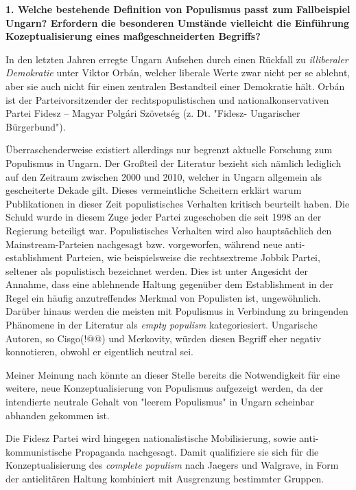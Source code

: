 \documentclass[11pt]{report}
\date{\today}
\title{}
\begin{document}
\tableofcontents

\textbf{1. Welche bestehende Definition von Populismus passt zum Fallbeispiel Ungarn? Erfordern die besonderen Umstände vielleicht die Einführung Kozeptualisierung eines maßgeschneiderten Begriffs?}

In den letzten Jahren erregte Ungarn Aufsehen durch einen Rückfall zu \emph{illiberaler Demokratie} unter Viktor Orbán, welcher liberale Werte zwar nicht per se ablehnt, aber sie auch nicht für einen zentralen Bestandteil einer Demokratie hält. Orbán ist der Parteivorsitzender der rechtspopulistischen und nationalkonservativen Partei Fidesz – Magyar Polgári Szövetség (z. Dt. "Fidesz- Ungarischer Bürgerbund").

Überraschenderweise existiert allerdings nur begrenzt aktuelle Forschung zum Populismus in Ungarn. Der Großteil der Literatur bezieht sich nämlich lediglich auf den Zeitraum zwischen 2000 und 2010, welcher in Ungarn allgemein als gescheiterte Dekade gilt. Dieses vermeintliche Scheitern erklärt warum Publikationen in dieser Zeit populistisches Verhalten kritisch beurteilt haben. Die Schuld wurde in diesem Zuge jeder Partei zugeschoben die seit 1998 an der Regierung beteiligt war. Populistisches Verhalten wird also hauptsächlich den Mainstream-Parteien nachgesagt bzw. vorgeworfen, während neue anti-establishment Parteien, wie beispielsweise die rechtsextreme Jobbik Partei, seltener als populistisch bezeichnet werden. Dies ist unter Angesicht der Annahme, dass eine ablehnende Haltung gegenüber dem Establishment in der Regel ein häufig anzutreffendes Merkmal von Populisten ist, ungewöhnlich. Darüber hinaus werden die meisten mit Populismus in Verbindung zu bringenden Phänomene in der Literatur als \emph{empty populism} kategoriesiert. Ungarische Autoren, so Cisgo(!@@) und Merkovity, würden diesen Begriff eher negativ konnotieren, obwohl er eigentlich neutral sei.

Meiner Meinung nach könnte an dieser Stelle bereits die Notwendigkeit für eine weitere, neue Konzeptualisierung von Populismus aufgezeigt werden, da der intendierte neutrale Gehalt von "leerem Populismus" in Ungarn scheinbar abhanden gekommen ist.

Die Fidesz Partei wird hingegen nationalistische Mobilisierung, sowie anti-kommunistische Propaganda nachgesagt. Damit qualifiziere sie sich für die Konzeptualisierung des \emph{complete populism} nach Jaegers und Walgrave, in Form der antielitären Haltung kombiniert mit Ausgrenzung bestimmter Gruppen.
\end{document}
